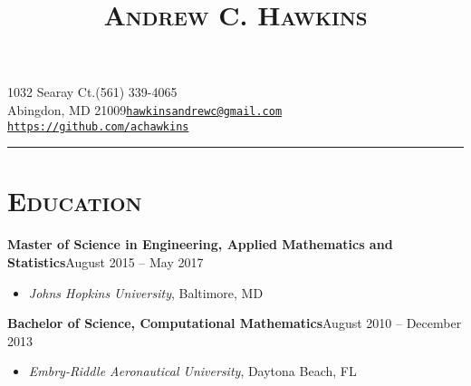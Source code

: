 \documentclass[10pt]{article}
\title{\textsc{\textbf{Andrew C. Hawkins}}\vspace{-13.7ex}}
\date{}
\author{}
\begin{document}
\maketitle

\section*{}
1032 Searay Ct.\hfill (561) 339-4065\\
Abingdon, MD 21009\hfill \texttt{\href{mailto:hawkinsandrewc@gmail.com}{hawkinsandrewc@gmail.com}}\\
\hspace*{\fill} \texttt{\url{https://github.com/achawkins}}

\noindent\rule{\textwidth}{1pt}


\section*{\textsc{Education}}
\textbf{Master of Science in Engineering, Applied Mathematics and Statistics}\hfill August 2015 -- May 2017
\begin{itemize}[noitemsep]
    \item[] \textit{Johns Hopkins University}, Baltimore, MD
\end{itemize}
\vspace{2ex}
\textbf{Bachelor of Science, Computational Mathematics}\hfill August 2010 -- December 2013
\begin{itemize}[noitemsep]
    \item[] \textit{Embry-Riddle Aeronautical University}, Daytona Beach, FL
\end{itemize}

\end{document}
